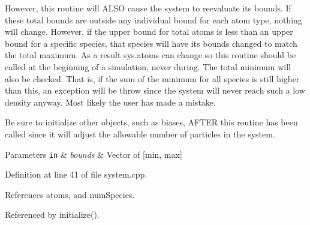 However, this routine will A\-L\-S\-O cause the system to reevaluate its bounds. If these total bounds are outside any individual bound for each atom type, nothing will change. However, if the upper bound for total atoms is less than an upper bound for a specific species, that species will have its bounds changed to match the total maximum. As a result sys.\-atoms can change so this routine should be called at the beginning of a simulation, never during. The total minimum will also be checked. That is, if the sum of the minimum for all species is still higher than this, an exception will be throw since the system will never reach such a low density anyway. Most likely the user has made a mistake.

Be sure to initialize other objects, such as biases, A\-F\-T\-E\-R this routine has been called since it will adjust the allowable number of particles in the system.


\begin{DoxyParams}[1]{Parameters}
\mbox{\tt in}  & {\em bounds} & Vector of \mbox{[}min, max\mbox{]} \\
\hline
\end{DoxyParams}


Definition at line 41 of file system.\-cpp.



References atoms, and num\-Species.



Referenced by initialize().


